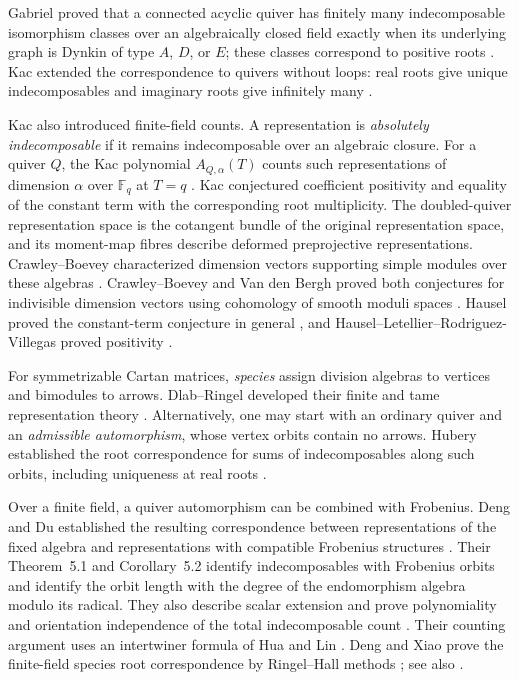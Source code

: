 \documentclass[11pt, reqno]{amsart}
\numberwithin{equation}{section}
\theoremstyle{definition}
\theoremstyle{remark}
\newcommand{\mb}[1]{\mathbb{#1}}
\begin{document}
Gabriel proved that a connected acyclic quiver has finitely many
indecomposable isomorphism classes over an algebraically closed field
exactly when its underlying graph is Dynkin of type $A$, $D$, or $E$;
these classes correspond to positive roots \cite{Gabriel}. Kac extended
the correspondence to quivers without loops: real roots give unique
indecomposables and imaginary roots give infinitely many
\cite{Kac80,Kac83}.

Kac also introduced finite-field counts. A representation is
\emph{absolutely indecomposable} if it remains indecomposable over an
algebraic closure. For a quiver $Q$, the Kac polynomial
$A_{Q,\alpha}(T)$ counts such representations of dimension $\alpha$
over $\mb F_q$ at $T=q$ \cite{Kac83}. Kac conjectured coefficient
positivity and equality of the constant term with the corresponding
root multiplicity. The doubled-quiver representation space is the
cotangent bundle of the original representation space, and its
moment-map fibres describe deformed preprojective representations.
Crawley--Boevey characterized dimension vectors supporting simple
modules over these algebras \cite{CBmoment}. Crawley--Boevey and
Van den Bergh proved both conjectures for indivisible dimension vectors
using cohomology of smooth moduli spaces \cite{CBVdB}. Hausel proved
the constant-term conjecture in general \cite{Hausel}, and
Hausel--Letellier--Rodriguez-Villegas proved positivity \cite{HLRV}.

For symmetrizable Cartan matrices, \emph{species} assign division
algebras to vertices and bimodules to arrows. Dlab--Ringel developed
their finite and tame representation theory \cite{DlabRingel}.
Alternatively, one may start with an ordinary quiver and an
\emph{admissible automorphism}, whose vertex orbits contain no arrows.
Hubery established the root correspondence for sums of indecomposables
along such orbits, including uniqueness at real roots \cite{Hubery}.

Over a finite field, a quiver automorphism can be combined with
Frobenius. Deng and Du established the resulting correspondence between
representations of the fixed algebra and representations with compatible
Frobenius structures \cite{DengDu}. Their Theorem~5.1 and
Corollary~5.2 identify indecomposables with Frobenius orbits and identify
the orbit length with the degree of the endomorphism algebra modulo its
radical. They also describe scalar extension and prove polynomiality and
orientation independence of the total indecomposable count
\cite[Corollaries~6.4 and~9.2]{DengDu}. Their counting argument uses an
intertwiner formula of Hua and Lin \cite{HuaLin}. Deng and Xiao prove
the finite-field species root correspondence by Ringel--Hall methods
\cite{DengXiao}; see also \cite[Section~6]{Hubery}.
\end{document}
